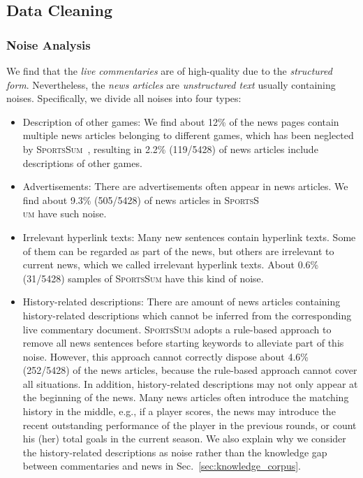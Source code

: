 \subsection{Data Cleaning}
\label{section:human_cleaning}

\subsubsection{Noise Analysis}
We find that the \emph{live commentaries} are of high-quality due to the \emph{structured form}. Nevertheless, the \emph{news articles} are \emph{unstructured text} usually containing noises. Specifically, we divide all noises into four types:

\begin{itemize}[leftmargin=*,topsep=0pt]
\item Description of other games: We find about 12\% of the news pages contain multiple news articles belonging to different games, which has been neglected by \textsc{SportsSum}~\cite{Huang2020GeneratingSN}, resulting in 2.2\% (119/5428) of news articles include descriptions of other games.

\item Advertisements: There are advertisements often appear in news articles. We find about 9.3\% (505/5428) of news articles in \textsc{SportsS\\um} have such noise.

\item Irrelevant hyperlink texts: Many new sentences contain hyperlink texts. Some of them can be regarded as part of the news, but others are irrelevant to current news, which we called irrelevant hyperlink texts. About 0.6\% (31/5428) samples of \textsc{SportsSum} have this kind of noise.

\item History-related descriptions: There are amount of news articles containing history-related descriptions which cannot be inferred from the corresponding live commentary document.
\textsc{SportsSum} adopts a rule-based approach to remove all news sentences before starting keywords to alleviate part of this noise.
However, this approach cannot correctly dispose about 4.6\% (252/5428) of the news articles, because the rule-based approach cannot cover all situations.
In addition, history-related descriptions may not only appear at the beginning of the news. Many news articles often introduce the matching history in the middle, e.g., if a player scores, the news may introduce the recent outstanding performance of the player in the previous rounds, or count his (her) total goals in the current season.
We also explain why we consider the history-related descriptions as noise rather than the knowledge gap between commentaries and news in Sec.~\ref{sec:knowledge_corpus}.
\end{itemize}

